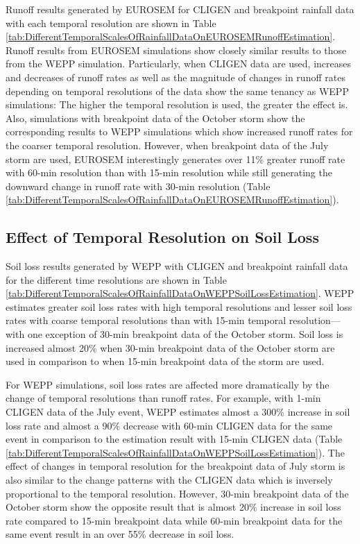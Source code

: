 Runoff results generated by EUROSEM for CLIGEN and breakpoint rainfall data with
each temporal resolution are shown in Table
\ref{tab:DifferentTemporalScalesOfRainfallDataOnEUROSEMRunoffEstimation}. Runoff
results from EUROSEM simulations show closely similar results to those from the
WEPP simulation. Particularly, when CLIGEN data are used, increases and
decreases of runoff rates as well as the magnitude of changes in runoff
rates depending on temporal resolutions of the data show the same tenancy as
WEPP simulations: The higher the temporal resolution is used, the greater the
effect is.
Also, simulations with breakpoint data of the October storm show the
corresponding results to WEPP simulations which show increased runoff rates for
the coarser temporal resolution. However, when breakpoint data of the July storm
are used, EUROSEM interestingly generates over 11\% greater runoff rate with
60-min resolution than with 15-min resolution while still generating the
downward change in runoff rate with 30-min resolution (Table
\ref{tab:DifferentTemporalScalesOfRainfallDataOnEUROSEMRunoffEstimation}).

\subsection{Effect of Temporal Resolution on Soil Loss}
\label{sec:TemporalScalesSimulatedSoilLoss}

Soil loss results generated by WEPP with CLIGEN and breakpoint rainfall data for
the different time resolutions are shown in Table
\ref{tab:DifferentTemporalScalesOfRainfallDataOnWEPPSoilLossEstimation}. WEPP
estimates greater soil loss rates with high temporal resolutions and lesser soil
loss rates with coarse temporal resolutions than with 15-min temporal
resolution---with one exception of 30-min breakpoint data of the October storm.
Soil loss is increased almost 20\% when 30-min breakpoint data of the October
storm are used in comparison to when 15-min breakpoint data of the storm are
used.

For WEPP simulations, soil loss rates are affected more dramatically by the
change of temporal resolutions than runoff rates. For example, with 1-min CLIGEN
data of the July event, WEPP estimates almost a 300\% increase in soil loss rate
and almost a 90\% decrease with 60-min CLIGEN data for the same event in
comparison to the estimation result with 15-min CLIGEN data (Table
\ref{tab:DifferentTemporalScalesOfRainfallDataOnWEPPSoilLossEstimation}). The
effect of changes in temporal resolution for the breakpoint data of July storm
is also similar to the change patterns with the CLIGEN data which is inversely
proportional to the temporal resolution. However, 30-min breakpoint data of the
October storm show the opposite result that is almost 20\% increase in soil loss
rate compared to 15-min breakpoint data while 60-min breakpoint data for the
same event result in an over 55\% decrease in soil loss.

